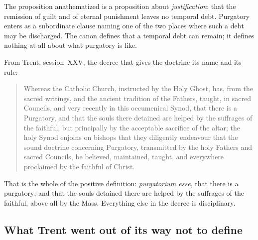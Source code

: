The proposition anathematized is a proposition about \emph{justification}: that the remission of guilt and of eternal punishment leaves no temporal debt. Purgatory enters as a subordinate clause naming one of the two places where such a debt may be discharged. The canon defines that a temporal debt can remain; it defines nothing at all about what purgatory is like.

From Trent, session~XXV, the decree that gives the doctrine its name and its rule:

\begin{quote}
Whereas the Catholic Church, instructed by the Holy Ghost, has, from the sacred writings, and the ancient tradition of the Fathers, taught, in sacred Councils, and very recently in this oecumenical Synod, that there is a Purgatory, and that the souls there detained are helped by the suffrages of the faithful, but principally by the acceptable sacrifice of the altar; the holy Synod enjoins on bishops that they diligently endeavour that the sound doctrine concerning Purgatory, transmitted by the holy Fathers and sacred Councils, be believed, maintained, taught, and everywhere proclaimed by the faithful of Christ.
\end{quote}

That is the whole of the positive definition: \emph{purgatorium esse}, that there is a purgatory; and that the souls detained there are helped by the suffrages of the faithful, above all by the Mass. Everything else in the decree is disciplinary.

\subsection{What Trent went out of its way not to define}

